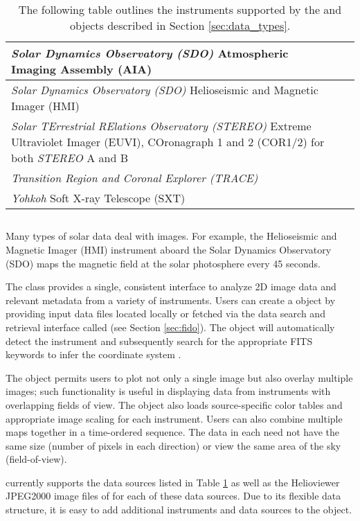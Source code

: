 \begin{table}
\begin{center}
\begin{tabular}{|p{10cm}|c|c|}
\hline
\textit{Solar Dynamics Observatory (SDO)} Atmospheric Imaging Assembly (AIA) & \citep{lemen2012} \\
\hline
\textit{Solar Dynamics Observatory (SDO)} Helioseismic and Magnetic Imager (HMI) & \citep{schou12}  \\
\hline
\textit{Solar TErrestrial RElations Observatory (STEREO)} Extreme Ultraviolet Imager (EUVI), COronagraph 1 and 2 (COR1/2) for both \textit{STEREO} A and B & \citep{howard2008sun} \\
\hline
\textit{Transition Region and Coronal Explorer (TRACE)}  & \citep{handy99}  \\
\hline
\textit{Yohkoh} Soft X-ray Telescope (SXT) & \citep{tsuneta1991soft}  \\
\hline
\end{tabular}
\end{center}
\caption{The following table outlines the instruments supported by the \Timeseries and \Map objects described in Section \ref{sec:data_types}.}
\label{tab:instruments}
\end{table}

\subsection{\Map}
\label{sec:map}
Many types of solar data deal with images. For example, the Helioseismic and Magnetic Imager (HMI) instrument aboard the Solar Dynamics Observatory (SDO) maps the magnetic field at the solar photosphere every 45 seconds. 

The \Map class provides a single, consistent interface to analyze 2D image data and relevant metadata from a variety of instruments. 
Users can create a \Map object by providing input data files located locally or fetched via the \sunpypkg data search and retrieval interface called \Fido (see Section \ref{sec:fido}). The \Map object will automatically detect the instrument and subsequently search for the appropriate FITS keywords to infer the coordinate system \citep{refId0, 2006A&A...449..791T}.

The \Map object permits users to plot not only a single image but also overlay multiple images; such functionality is useful in displaying data from instruments with overlapping fields of view. The \Map object also loads source-specific color tables and appropriate image scaling for each instrument.
Users can also combine multiple maps together in a time-ordered sequence. The data in each \Map need not have the same size (number of pixels in each direction) or view the same area of the sky (field-of-view). 

\Map currently supports the data sources listed in Table \ref{tab:instruments} as well as the Helioviewer JPEG2000 image files of for each of these data sources. Due to its flexible data structure, it is easy to add additional instruments and data sources to the \Map object.
